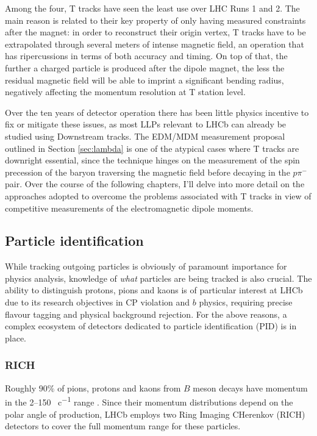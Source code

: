 Among the four, T tracks have seen the least use over LHC Runs 1 and 2.
The main reason is related to their key property of only having measured constraints after the magnet:
in order to reconstruct their origin vertex, T tracks have to be extrapolated through several meters of intense magnetic field, an operation that has ripercussions in terms of both accuracy and timing.
On top of that, the further a charged particle is produced after the dipole magnet, the less the residual magnetic field will be able to imprint a significant bending radius, negatively affecting the momentum resolution at T station level.

Over the ten years of detector operation there has been little physics incentive to fix or mitigate these issues, as most LLPs relevant to LHCb can already be studied using Downstream tracks.
The \lz EDM/MDM measurement proposal outlined in Section \ref{sec:lambda} is one of the atypical cases where T tracks are downright essential, since the technique hinges on the measurement of the spin precession of the baryon traversing the magnetic field before decaying in the $p\pi^-$ pair.
Over the course of the following chapters, I'll delve into more detail on the approaches adopted to overcome the problems associated with T tracks in view of competitive measurements of the \lz electromagnetic dipole moments.


\subsection{Particle identification}
\label{sec:2:pid}
While tracking outgoing particles is obviously of paramount importance for physics analysis, knowledge of \textit{what} particles are being tracked is also crucial.
The ability to distinguish protons, pions and kaons is of particular interest at LHCb due to its research objectives in CP violation and $b$ physics, requiring precise flavour tagging and physical background rejection.
For the above reasons, a complex ecosystem of detectors dedicated to particle identification (PID) is in place.

\subsubsection{RICH}
Roughly $90\%$ of pions, protons and kaons from $B$ meson decays have momentum in the 2--150 \si{\gev\per c} range \cite{HistoryLHCb}.
Since their momentum distributions depend on the polar angle of production, LHCb employs two Ring Imaging CHerenkov (RICH) detectors \cite{Amato:494263} to cover the full momentum range for these particles.

